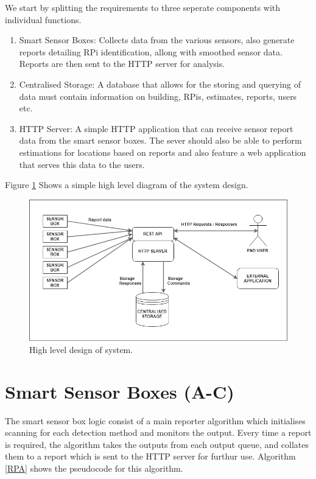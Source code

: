 \documentclass{l4proj}
\begin{document}
We start by splitting the requirements to three seperate components with individual functions.
\begin{enumerate}
  \item Smart Sensor Boxes:
	Collects data from the various sensors, also generate reports detailing RPi identification, allong with smoothed sensor data. Reports are then sent to the HTTP server for analysis. 
  \item Centralised Storage:
	A database that allows for the storing and querying of data must contain information on building, RPis, estimates, reports, users etc.
  \item HTTP Server:
	A simple HTTP application that can receive sensor report data from the smart sensor boxes. The sever should also be able to perform estimations for locations based on reports and also feature a web application that serves this data to the users. 
\end{enumerate}
Figure \ref{fig:overalldiag} Shows a simple high level diagram of the system design.

\begin{figure}
\centering
\includegraphics[width=\textwidth]{overalldiag}
\caption{High level design of system.}
\label{fig:overalldiag}
\end{figure}


\section{Smart Sensor Boxes (A-C)}
The smart sensor box logic consist of a main reporter algorithm which initialises scanning for each detection method and monitors the output. Every time a report is required, the algorithm takes the outputs from each output queue, and collates them to a report which is sent to the HTTP server for furthur use.  Algorithm \ref{RPA} shows the pseudocode for this algorithm.
\end{document}
